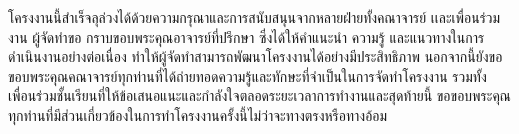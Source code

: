\begin{acknowledgments}
    โครงงานนี้สำเร็จลุล่วงได้ด้วยความกรุณาและการสนับสนุนจากหลายฝ่ายทั้งคณาจารย์ เเละเพื่อนร่วมงาน ผู้จัดทำขอ กราบขอบพระคุณอาจารย์ที่ปรึกษา ซึ่งได้ให้คำแนะนำ ความรู้ และแนวทางในการดำเนินงานอย่างต่อเนื่อง ทำให้ผู้จัดทำสามารถพัฒนาโครงงานได้อย่างมีประสิทธิภาพ นอกจากนี้ยังขอขอบพระคุณคณาจารย์ทุกท่านที่ได้ถ่ายทอดความรู้และทักษะที่จำเป็นในการจัดทำโครงงาน รวมทั้งเพื่อนร่วมชั้นเรียนที่ให้ข้อเสนอแนะและกำลังใจตลอดระยะเวลาการทำงานและสุดท้ายนี้ ขอขอบพระคุณทุกท่านที่มีส่วนเกี่ยวข้องในการทำโครงงานครั้งนี้ไม่ว่าจะทางตรงหรือทางอ้อม

\end{acknowledgments}%
\fi %

\contentspage

\ifproject
\figurelistpage

\tablelistpage
\fi %



